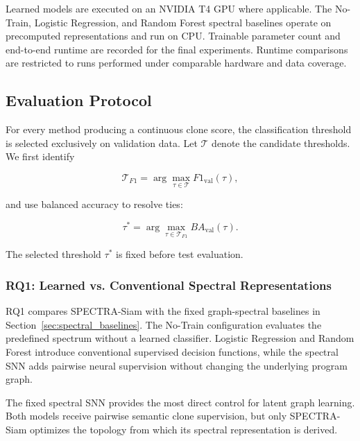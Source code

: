 \documentclass[authoryear,final,5p,times,twocolumn]{elsarticle}
\theoremstyle{plain}
\begin{document}
Learned models are executed on an NVIDIA T4 GPU where applicable. The
No-Train, Logistic Regression, and Random Forest spectral baselines operate
on precomputed representations and run on CPU. Trainable parameter count and
end-to-end runtime are recorded for the final experiments. Runtime comparisons
are restricted to runs performed under comparable hardware and data coverage.


\subsection{Evaluation Protocol}
\label{sec:evaluation_settings}

For every method producing a continuous clone score, the classification
threshold is selected exclusively on validation data. Let $\mathcal{T}$ denote
the candidate thresholds. We first identify

\begin{equation}
\label{eq:f1_optimal_thresholds}
\mathcal{T}_{F1}
=
\arg\max_{\tau\in\mathcal{T}}
F1_{\mathrm{val}}(\tau),
\end{equation}

and use balanced accuracy to resolve ties:

\begin{equation}
\label{eq:validation_threshold}
\tau^{*}
=
\arg\max_{\tau\in\mathcal{T}_{F1}}
BA_{\mathrm{val}}(\tau).
\end{equation}

The selected threshold $\tau^{*}$ is fixed before test evaluation.


\subsubsection{RQ1: Learned vs. Conventional Spectral Representations}
\label{sec:rq1_evaluation}

RQ1 compares SPECTRA-Siam with the fixed graph-spectral baselines in
Section~\ref{sec:spectral_baselines}. The No-Train configuration evaluates
the predefined spectrum without a learned classifier. Logistic Regression and
Random Forest introduce conventional supervised decision functions, while
the spectral SNN adds pairwise neural supervision without changing the
underlying program graph.

The fixed spectral SNN provides the most direct control for latent graph
learning. Both models receive pairwise semantic clone supervision, but only
SPECTRA-Siam optimizes the topology from which its spectral representation is
derived.
\end{document}

